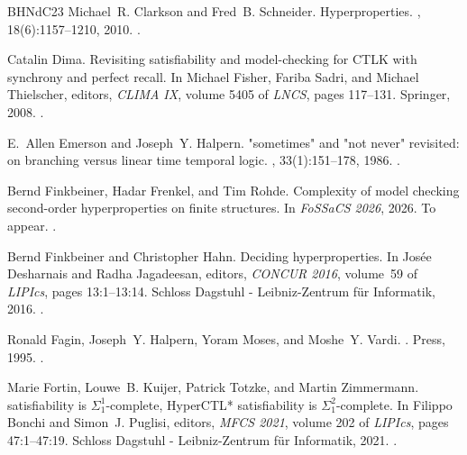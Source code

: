 \documentclass[dvipsnames,10pt,a4paper]{amsart}
\theoremstyle{definition}
\theoremstyle{remark}
\begin{document}
\begin{thebibliography}{BHNdC23}
Michael~R. Clarkson and Fred~B. Schneider.
\newblock Hyperproperties.
, 18(6):1157--1210, 2010.
\newblock \href {https://doi.org/10.3233/JCS-2009-0393}
  {}.

Catalin Dima.
\newblock Revisiting satisfiability and model-checking for {CTLK} with
  synchrony and perfect recall.
\newblock In Michael Fisher, Fariba Sadri, and Michael Thielscher, editors,
  {\em {CLIMA IX}}, volume 5405 of {\em LNCS}, pages 117--131. Springer, 2008.
\newblock \href {https://doi.org/10.1007/978-3-642-02734-5\_8}
  {}.

E.~Allen Emerson and Joseph~Y. Halpern.
\newblock "sometimes" and "not never" revisited: on branching versus linear
  time temporal logic.
, 33(1):151--178, 1986.
\newblock \href {https://doi.org/10.1145/4904.4999}
  {}.

Bernd Finkbeiner, Hadar Frenkel, and Tim Rohde.
\newblock Complexity of model checking second-order hyperproperties on finite
  structures.
\newblock In {\em FoSSaCS 2026}, 2026.
\newblock To appear.
\newblock \href {https://doi.org/10.48550/arXiv.2601.12361}
  {}.

Bernd Finkbeiner and Christopher Hahn.
\newblock Deciding hyperproperties.
\newblock In Jos{\'{e}}e Desharnais and Radha Jagadeesan, editors, {\em
  {CONCUR} 2016}, volume~59 of {\em LIPIcs}, pages 13:1--13:14. Schloss
  Dagstuhl - Leibniz-Zentrum für Informatik, 2016.
\newblock \href {https://doi.org/10.4230/LIPIcs.CONCUR.2016.13}
  {}.

Ronald Fagin, Joseph~Y. Halpern, Yoram Moses, and Moshe~Y. Vardi.
.
 Press, 1995.
\newblock \href {https://doi.org/10.7551/MITPRESS/5803.001.0001}
  {}.

Marie Fortin, Louwe~B. Kuijer, Patrick Totzke, and Martin Zimmermann.
 satisfiability is {$\Sigma_1^1$}-complete, {HyperCTL*}
  satisfiability is {$\Sigma_1^2$}-complete.
\newblock In Filippo Bonchi and Simon~J. Puglisi, editors, {\em {MFCS} 2021},
  volume 202 of {\em LIPIcs}, pages 47:1--47:19. Schloss Dagstuhl -
  Leibniz-Zentrum für Informatik, 2021.
\newblock \href {https://doi.org/10.4230/LIPICS.MFCS.2021.47}
  {}.


\end{thebibliography}
\end{document}
